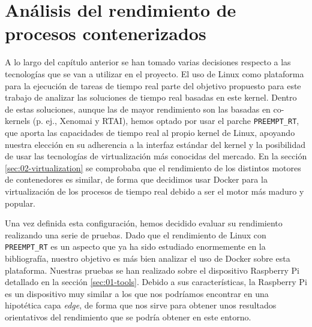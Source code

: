 \chapter{Análisis del rendimiento de procesos contenerizados}
\label{ch:03-performance_analysis}

A lo largo del capítulo anterior se han tomado varias decisiones respecto a las
tecnologías que se van a utilizar en el proyecto. El uso de Linux como
plataforma para la ejecución de tareas de tiempo real parte del objetivo
propuesto para este trabajo de analizar las soluciones de tiempo real basadas en
este kernel. Dentro de estas soluciones, aunque las de mayor rendimiento son las
basadas en co-kernels (p. ej., Xenomai y RTAI), hemos optado por usar el parche
\texttt{PREEMPT\_RT}, que aporta las capacidades de tiempo real al propio kernel
de Linux, apoyando nuestra elección en su adherencia a la interfaz estándar del
kernel y la posibilidad de usar las tecnologías de virtualización más conocidas
del mercado. En la sección \ref{sec:02-virtualization} se comprobaba que el
rendimiento de los distintos motores de contenedores es similar, de forma que
decidimos usar Docker para la virtualización de los procesos de tiempo real
debido a ser el motor más maduro y popular.

Una vez definida esta configuración, hemos decidido evaluar su rendimiento
realizando una serie de pruebas. Dado que el rendimiento de Linux con
\texttt{PREEMPT\_RT} es un aspecto que ya ha sido estudiado enormemente en la
bibliografía, nuestro objetivo es más bien analizar el uso de Docker sobre esta
plataforma. Nuestras pruebas se han realizado sobre el dispositivo Raspberry Pi
detallado en la sección \ref{sec:01-tools}. Debido a sus características, la
Raspberry Pi es un dispositivo muy similar a los que nos podríamos encontrar en
una hipotética capa \textit{edge}, de forma que nos sirve para obtener unos
resultados orientativos del rendimiento que se podría obtener en este entorno.

